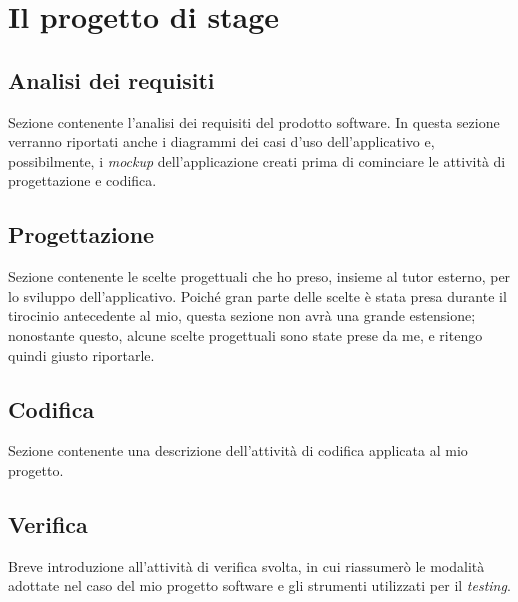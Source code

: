 
\chapter{Il progetto di stage}
\label{cap:progetto-stage}

\section{Analisi dei requisiti}

Sezione contenente l'analisi dei requisiti del prodotto software. In questa sezione verranno riportati anche i diagrammi dei casi d'uso dell'applicativo e, possibilmente, i \textit{mockup} dell'applicazione creati prima di cominciare le attività di progettazione e codifica.


\section{Progettazione}

Sezione contenente le scelte progettuali che ho preso, insieme al tutor esterno, per lo sviluppo dell'applicativo. Poiché gran parte delle scelte è stata presa durante il tirocinio antecedente al mio, questa sezione non avrà una grande estensione; nonostante questo, alcune scelte progettuali sono state prese da me, e ritengo quindi giusto riportarle.


\section{Codifica}

Sezione contenente una descrizione dell'attività di codifica applicata al mio progetto.


\section{Verifica}

Breve introduzione all'attività di verifica svolta, in cui riassumerò le modalità adottate nel caso del mio progetto software e gli strumenti utilizzati per il \textit{testing}.

